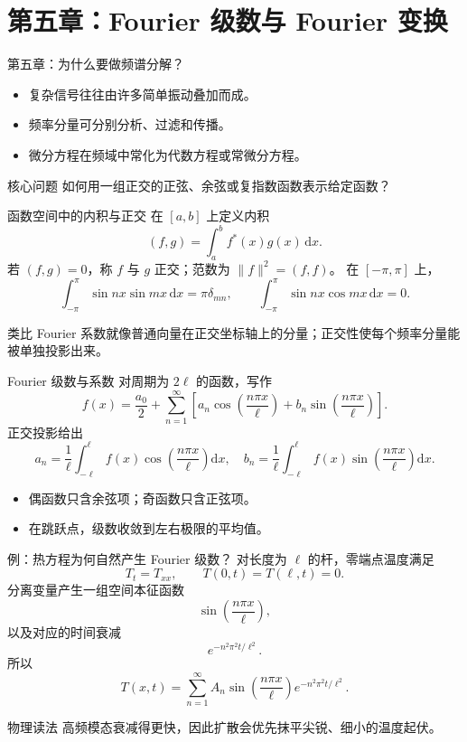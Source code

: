 \section{第五章：Fourier 级数与 Fourier 变换}

\begin{frame}{第五章：为什么要做频谱分解？}
  \begin{itemize}
    \item 复杂信号往往由许多简单振动叠加而成。
    \item 频率分量可分别分析、过滤和传播。
    \item 微分方程在频域中常化为代数方程或常微分方程。
  \end{itemize}
  \begin{block}{核心问题}
    如何用一组正交的正弦、余弦或复指数函数表示给定函数？
  \end{block}
\end{frame}

\begin{frame}{函数空间中的内积与正交}
  在 $[a,b]$ 上定义内积
  \[
    (f,g)=\int_a^b f^*(x)g(x)\,\mathrm{d}x.
  \]
  若 $(f,g)=0$，称 $f$ 与 $g$ 正交；范数为 $\|f\|^2=(f,f)$。
  在 $[-\pi,\pi]$ 上，
  \[
    \int_{-\pi}^{\pi}\sin nx\sin mx\,\mathrm{d}x=\pi\delta_{mn},
    \qquad
    \int_{-\pi}^{\pi}\sin nx\cos mx\,\mathrm{d}x=0.
  \]
  \begin{block}{类比}
    Fourier 系数就像普通向量在正交坐标轴上的分量；正交性使每个频率分量能被单独投影出来。
  \end{block}
\end{frame}

\begin{frame}{Fourier 级数与系数}
  对周期为 $2\ell$ 的函数，写作
  \[
    f(x)=\frac{a_0}{2}+\sum_{n=1}^{\infty}
    \left[a_n\cos\left(\frac{n\pi x}{\ell}\right)+
    b_n\sin\left(\frac{n\pi x}{\ell}\right)\right].
  \]
  正交投影给出
  \[
    a_n=\frac{1}{\ell}\int_{-\ell}^{\ell}f(x)
    \cos\left(\frac{n\pi x}{\ell}\right)\mathrm{d}x,
    \quad
    b_n=\frac{1}{\ell}\int_{-\ell}^{\ell}f(x)
    \sin\left(\frac{n\pi x}{\ell}\right)\mathrm{d}x.
  \]
  \begin{itemize}
    \item 偶函数只含余弦项；奇函数只含正弦项。
    \item 在跳跃点，级数收敛到左右极限的平均值。
  \end{itemize}
\end{frame}

\begin{frame}{例：热方程为何自然产生 Fourier 级数？}
  对长度为 $\ell$ 的杆，零端点温度满足
  \[
    T_t=T_{xx},\qquad T(0,t)=T(\ell,t)=0.
  \]
  分离变量产生一组空间本征函数
  \[
    \sin\left(\frac{n\pi x}{\ell}\right),
  \]
  以及对应的时间衰减
  \[
    e^{-n^2\pi^2t/\ell^2}.
  \]
  所以
  \[
    T(x,t)=\sum_{n=1}^{\infty}A_n
    \sin\left(\frac{n\pi x}{\ell}\right)e^{-n^2\pi^2t/\ell^2}.
  \]
  \begin{alertblock}{物理读法}
    高频模态衰减得更快，因此扩散会优先抹平尖锐、细小的温度起伏。
  \end{alertblock}
\end{frame}

